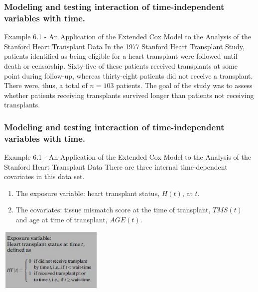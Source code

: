 \documentclass{beamer}
\theoremstyle{definition}
\begin{document}
\begin{frame}
\frametitle{Modeling and testing interaction of time-independent variables with time.}
\begin{block}{Example 6.1 - An Application of the Extended Cox Model to the Analysis of the Stanford Heart Transplant Data}
In the 1977 Stanford Heart Transplant
Study, patients identified as being eligible for a
heart transplant were followed until death or
censorship. Sixty-five of these patients received
transplants at some point during follow-up,
whereas thirty-eight patients did not receive a
transplant. There were, thus, a total of $n = 103$
patients. The goal of the study was to assess
whether patients receiving transplants survived
longer than patients not receiving transplants.
\end{block}
\end{frame}


\begin{frame}
\frametitle{Modeling and testing interaction of time-independent variables with time.}
\begin{block}{Example 6.1 - An Application of the Extended Cox Model to the Analysis of the Stanford Heart Transplant Data}
There are three internal time-dependent covariates in this data set.
\vspace{-15pt}
\begin{enumerate}
\item The exposure variable: heart transplant status, $H(t)$, at $t$.
\item The covariates: tissue mismatch score at the time of transplant, $TMS(t)$ and age at time of transplant, $AGE(t)$.
\end{enumerate}
\begin{center}
 \includegraphics[width = 5cm, height=3cm]{CH6_tnsp1.JPG}
 \end{center}
\end{block}
\end{frame}
\end{document}
